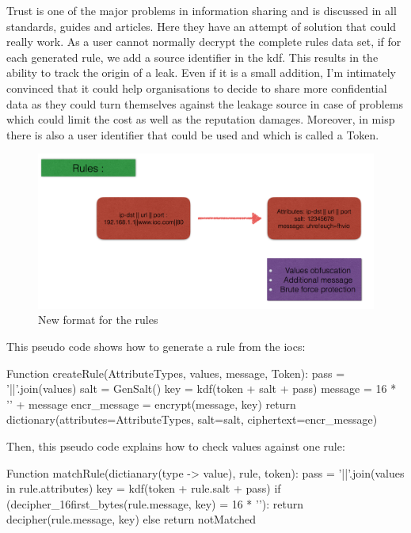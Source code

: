 \documentclass{eplmastersthesis}
\begin{document}
Trust is one of the major problems in information sharing and is discussed in all standards, guides and articles. Here they have an attempt of solution that could really work. As a user cannot normally decrypt the complete rules data set, if for each generated rule, we add a source identifier in the \gls{kdf}. This results in the ability to track the origin of a leak. 
Even if it is a small addition, I'm intimately convinced that it could help organisations to decide to share more confidential data as they could turn themselves against the leakage source in case of problems which could limit the cost as well as the reputation damages. Moreover, in \gls{misp} there is also a user identifier that could be used and which is called a Token.\\

\begin{figure}[h!]
\begin{center}
	\includegraphics[scale=0.5]{res/obfuscation-rule}
	\caption{New format for the rules}
	\label{Obfuscation-Rule}
\end{center}
\end{figure}


This pseudo code shows how to generate a rule from the \glspl{ioc}:

\begin{center}
\begin{boxedverbatim}
Function createRule(AttributeTypes, values, message, Token):
        pass = '||'.join(values)
        salt = GenSalt()
        key = kdf(token + salt + pass)
        message = 16 * '' + message
        encr_message = encrypt(message, key)
        return dictionary(attributes=AttributeTypes, 
                            salt=salt,
                            ciphertext=encr_message)
\end{boxedverbatim}
\end{center}

Then, this pseudo code explains how to check values against one rule:
\begin{center}
\begin{boxedverbatim}
Function matchRule(dictianary(type -> value), rule, token):
        pass = '||'.join(values in rule.attributes)
        key = kdf(token + rule.salt + pass)
        if (decipher_16first_bytes(rule.message, key) = 16 * ''):
                return decipher(rule.message, key)
        else
                return notMatched
\end{boxedverbatim}
\end{center}
\end{document}
